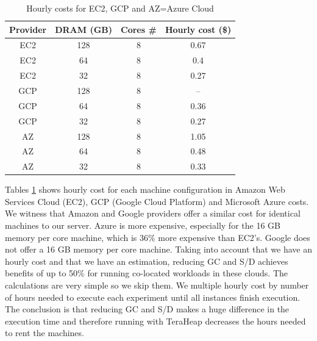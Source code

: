\begin{table}[t!]
  \centering
  \caption{Hourly costs for EC2, GCP and AZ=Azure Cloud}
  \label{tab:cost_table}
  \begin{tabular}{|c|c|c|c|}
    \hline
	  \textbf{Provider} & \textbf{DRAM (GB)} & \textbf{Cores #} & \textbf{Hourly cost (\$)} \\
    \hline
	  EC2 & 128 & 8 & 0.67  \\
	  EC2 & 64 & 8 & 0.4 \\
	  EC2 & 32 & 8 & 0.27 \\
	  GCP & 128 & 8 & -- \\
	  GCP & 64 & 8 & 0.36 \\
	  GCP & 32 & 8 & 0.27 \\
	  AZ & 128 & 8 & 1.05 \\
	  AZ & 64 & 8 & 0.48 \\
	  AZ & 32 & 8 & 0.33 \\ 
	  \hline
  \end{tabular}
\end{table}


Tables \ref{tab:cost_table} shows hourly cost for each machine configuration in 
Amazon Web Services Cloud (EC2), GCP (Google Cloud Platform) and Microsoft Azure costs. 
We witness that Amazon and Google providers offer a similar cost for identical machines to our server.
Azure is more expensive, especially for the 16 GB memory per core machine, which is 36\% more expensive than EC2's.
Google does not offer a 16 GB memory per core machine.
Taking into account that we have an hourly cost and that we have an estimation,
reducing GC and S/D achieves benefits of up to 50\% for running co-located workloads in these clouds. The calculations are very simple so we skip them. We multiple hourly cost
by number of hours needed to execute each experiment until all instances finish execution. The conclusion is that reducing GC and S/D makes a huge difference in the execution time and therefore running with TeraHeap decreases the hours needed to rent the machines.


